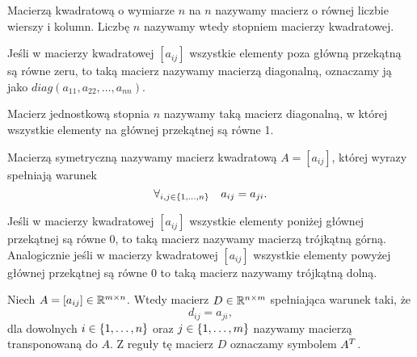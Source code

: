 \documentclass[10pt,a4paper]{report}
\newcommand{\mx}[1]{{#1}}
\begin{document}
\begin{definition} \label{definicja-macierzy}
Macierzą kwadratową o wymiarze $n$ na $n$ nazywamy macierz o równej liczbie wierszy i kolumn. Liczbę $n$ nazywamy wtedy stopniem macierzy kwadratowej.
\end{definition}

\begin{definition}
Jeśli w macierzy kwadratowej $[a_{ij}]$ wszystkie elementy poza główną przekątną są równe zeru, to taką macierz nazywamy macierzą diagonalną, oznaczamy ją jako $diag(a_{11}, a_{22},\ldots,a_{nn})$.
\end{definition}

\begin{definition}
Macierz jednostkową stopnia $n$ nazywamy taką macierz diagonalną, w której wszystkie elementy na głównej przekątnej są równe 1.
\end{definition}

\begin{definition}
Macierzą symetryczną nazywamy macierz kwadratową $\mx{A}=[a_{ij}]$, której wyrazy spełniają warunek 
$$
\forall_{i,j \in \left\lbrace {1,\ldots,n} \right\rbrace} \quad a_{ij}=a_{ji}.
$$
\end{definition}

\begin{definition}
Jeśli w macierzy kwadratowej $[a_{ij}]$ wszystkie elementy poniżej głównej przekątnej są równe $0$, to taką macierz nazywamy macierzą trójkątną górną.
Analogicznie jeśli w macierzy kwadratowej $[a_{ij}]$ wszystkie elementy powyżej głównej przekątnej są równe $0$ to taką macierz nazywamy trójkątną dolną.
\end{definition}

\begin{definition}
Niech $\mx{A}=[a_{ij}] \in \setR^{m \times n}$. Wtedy macierz $D \in \mathbb{R}^{n \times m}$ spełniająca warunek taki, że
$$
d_{ij} = a_{ji},
$$
dla dowolnych $i \in \left\lbrace {1,\ldots, n} \right\rbrace$ oraz $j \in \left\lbrace {1,\ldots,m} \right\rbrace$ nazywamy macierzą transponowaną do $A$. Z reguły tę macierz $D$ oznaczamy symbolem ${A}^T$.
\end{definition}

\end{document}

